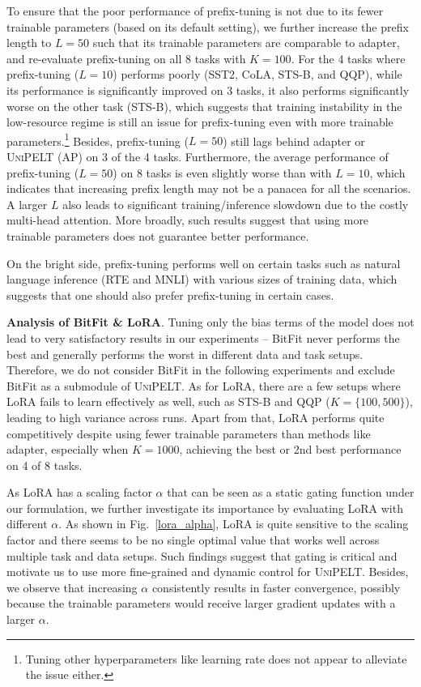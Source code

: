 To ensure that the poor performance of prefix-tuning is not due to its fewer trainable parameters (based on its default setting), we further increase the prefix length to $L=50$ such that its trainable parameters are comparable to adapter, and re-evaluate prefix-tuning on all 8 tasks with $K = 100$. For the 4 tasks where prefix-tuning ($L=10$) performs poorly (SST2, CoLA, STS-B, and QQP), while its performance is significantly improved on 3 tasks, it also performs significantly worse on the other task (STS-B), which suggests that training instability in the low-resource regime is still an issue for prefix-tuning even with more trainable parameters.\footnote{Tuning other hyperparameters like learning rate does not appear to alleviate the issue either.} Besides, prefix-tuning ($L=50$) still lags behind adapter or \textsc{UniPELT} (AP) on 3 of the 4 tasks. Furthermore, the average performance of prefix-tuning ($L=50$) on 8 tasks is even slightly worse than with $L=10$, which indicates that increasing prefix length may not be a panacea for all the scenarios. A larger $L$ also leads to significant training/inference slowdown due to the costly multi-head attention. More broadly, such results suggest that {using more trainable parameters does not guarantee better performance}.

On the bright side, prefix-tuning performs well on certain tasks such as natural language inference (RTE and MNLI) with various sizes of training data, which suggests that one should also prefer prefix-tuning in certain cases.

{{\bf Analysis of BitFit \& LoRA}.} Tuning only the bias terms of the model does not lead to very satisfactory results in our experiments -- BitFit never performs the best and generally performs the worst in different data and task setups. Therefore, we do not consider BitFit in the following experiments and exclude BitFit as a submodule of \textsc{UniPELT}.
As for LoRA, there are a few setups where LoRA fails to learn effectively as well, such as STS-B and QQP ($K=\{100, 500\}$), leading to high variance across runs. Apart from that, LoRA performs quite competitively despite using fewer trainable parameters than methods like adapter, especially when $K=1000$, achieving the best or 2nd best performance on 4 of 8 tasks.

As LoRA has a scaling factor $\alpha$ that can be seen as a static gating function under our formulation, we further investigate its importance by evaluating LoRA with different $\alpha$.
As shown in Fig.~\ref{lora_alpha}, LoRA is quite sensitive to the scaling factor and there seems to be no single optimal value that works well across multiple task and data setups. Such findings suggest that gating is critical and motivate us to use more fine-grained and dynamic control for \textsc{UniPELT}.
Besides, we observe that increasing $\alpha$ consistently results in faster convergence, possibly because the trainable parameters would receive larger gradient updates with a larger $\alpha$.

